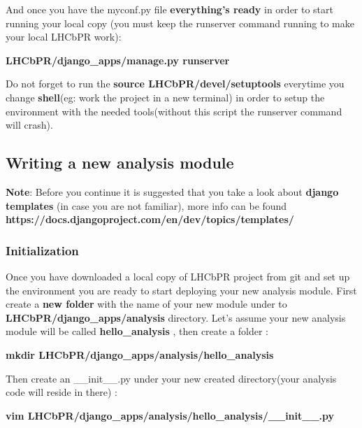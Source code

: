 \documentclass{lhcbnote}
\begin{document}
\vspace{2 mm}

And once you have the myconf.py file {\bf everything's ready} in order to start running your local copy (you must keep the runserver command running to make your local LHCbPR work):

\vspace{2 mm}

{\bf LHCbPR/django\_apps/manage.py runserver}

\vspace{2 mm}

Do not forget to run the {\bf source LHCbPR/devel/setuptools} everytime you change {\bf shell}(eg: work the project in a new terminal) 
in order to setup the environment with the needed tools(without this script the runserver command will crash).

\subsection{Writing a new analysis module}

{\bf Note}: Before you continue it is suggested that you take a look about {\bf django templates} (in case you are not familiar), more info can be found {\bf https://docs.djangoproject.com/en/dev/topics/templates/}

\subsubsection{Initialization}

Once you have downloaded a local copy of LHCbPR project from git and set up the environment you are ready to start deploying your new analysis module.
First create a {\bf new folder} with the name of your new module under to {\bf LHCbPR/django\_apps/analysis} directory. Let's assume your new analysis module will be called {\bf hello\_analysis} , then create a folder :

\vspace{2 mm}

{\bf mkdir LHCbPR/django\_apps/analysis/hello\_analysis}

\vspace{2 mm}

Then create an \_\_init\_\_.py under your new created directory(your analysis code will reside in there) :

\vspace{2 mm}

{\bf vim LHCbPR/django\_apps/analysis/hello\_analysis/\_\_init\_\_.py}
\end{document}
